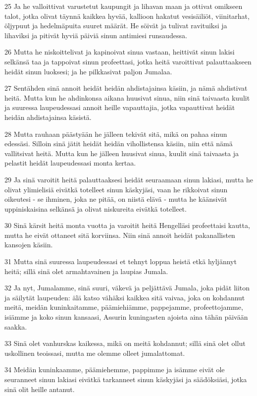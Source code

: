 \par 25 Ja he valloittivat varustetut kaupungit ja lihavan maan ja ottivat omikseen talot, jotka olivat täynnä kaikkea hyvää, kallioon hakatut vesisäiliöt, viinitarhat, öljypuut ja hedelmäpuita suuret määrät. He söivät ja tulivat ravituiksi ja lihaviksi ja pitivät hyviä päiviä sinun antimiesi runsaudessa.
\par 26 Mutta he niskoittelivat ja kapinoivat sinua vastaan, heittivät sinun lakisi selkänsä taa ja tappoivat sinun profeettasi, jotka heitä varoittivat palauttaakseen heidät sinun luoksesi; ja he pilkkasivat paljon Jumalaa.
\par 27 Sentähden sinä annoit heidät heidän ahdistajainsa käsiin, ja nämä ahdistivat heitä. Mutta kun he ahdinkonsa aikana huusivat sinua, niin sinä taivaasta kuulit ja suuressa laupeudessasi annoit heille vapauttajia, jotka vapauttivat heidät heidän ahdistajainsa käsistä.
\par 28 Mutta rauhaan päästyään he jälleen tekivät sitä, mikä on pahaa sinun edessäsi. Silloin sinä jätit heidät heidän vihollistensa käsiin, niin että nämä vallitsivat heitä. Mutta kun he jälleen huusivat sinua, kuulit sinä taivaasta ja pelastit heidät laupeudessasi monta kertaa.
\par 29 Ja sinä varoitit heitä palauttaaksesi heidät seuraamaan sinun lakiasi, mutta he olivat ylimielisiä eivätkä totelleet sinun käskyjäsi, vaan he rikkoivat sinun oikeutesi - se ihminen, joka ne pitää, on niistä elävä - mutta he käänsivät uppiniskaisina selkänsä ja olivat niskureita eivätkä totelleet.
\par 30 Sinä kärsit heitä monta vuotta ja varoitit heitä Hengelläsi profeettaisi kautta, mutta he eivät ottaneet sitä korviinsa. Niin sinä annoit heidät pakanallisten kansojen käsiin.
\par 31 Mutta sinä suuressa laupeudessasi et tehnyt loppua heistä etkä hyljännyt heitä; sillä sinä olet armahtavainen ja laupias Jumala.
\par 32 Ja nyt, Jumalamme, sinä suuri, väkevä ja peljättävä Jumala, joka pidät liiton ja säilytät laupeuden: älä katso vähäksi kaikkea sitä vaivaa, joka on kohdannut meitä, meidän kuninkaitamme, päämiehiämme, pappejamme, profeettojamme, isiämme ja koko sinun kansaasi, Assurin kuningasten ajoista aina tähän päivään saakka.
\par 33 Sinä olet vanhurskas kaikessa, mikä on meitä kohdannut; sillä sinä olet ollut uskollinen teoissasi, mutta me olemme olleet jumalattomat.
\par 34 Meidän kuninkaamme, päämiehemme, pappimme ja isämme eivät ole seuranneet sinun lakiasi eivätkä tarkanneet sinun käskyjäsi ja säädöksiäsi, jotka sinä olit heille antanut.
